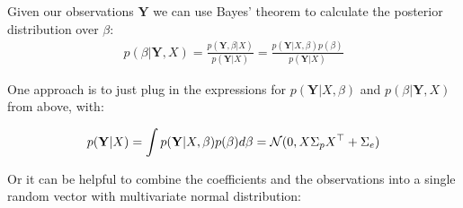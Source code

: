 Given our observations $\mathbf{Y}$  we can use Bayes' theorem to calculate the posterior distribution over $\beta$:
\begin{gather*}
    p(\beta| \mathbf{Y}, X) = \frac{p(\mathbf{Y},\beta|X)}{p(\mathbf{Y}|X)} =
    \frac{p(\mathbf{Y}|X,\beta)p(\beta)}{p(\mathbf{Y}|X)}
\end{gather*}

One approach is to just plug in the expressions for
$p(\mathbf{Y}|X,\beta)$ and $p(\beta|\mathbf{Y}, X)$ from above, with:

\begin{gather*}
    p(\mathbf{Y}|X) = \int p(\mathbf{Y}|X,\beta) p(\beta) d\beta = \operatorname{\mathcal{N}}(0, X \Sigma_p X^{\top} + \Sigma_e)
\end{gather*}

Or it can be helpful to combine the coefficients and the observations into a single random vector with
multivariate normal distribution:

